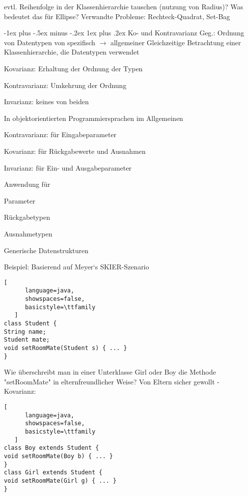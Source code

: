 \documentclass[10pt]{article}
\makeatletter
\renewcommand{\subsubsection}{\@startsection{subsubsection}{3}{0mm}%
                                {-1ex plus -.5ex minus -.2ex}%
                                {1ex plus .2ex}%
                                {\normalfont\small\bfseries}}
\makeatother
\begin{document}
evtl. Reihenfolge in der Klassenhierarchie tauschen (nutzung von Radius)? Was bedeutet das für Ellipse?
Verwandte Probleme: Rechteck-Quadrat, Set-Bag

\subsubsection{Ko- und Kontravarianz}
Geg.: Ordnung von Datentypen von spezifisch $\rightarrow$ allgemeiner
Gleichzeitige Betrachtung einer Klassenhierarchie, die Datentypen verwendet
\begin{itemize*}
  \item Kovarianz: Erhaltung der Ordnung der Typen
  \item Kontravarianz: Umkehrung der Ordnung
  \item Invarianz: keines von beiden
\end{itemize*}
In objektorientierten Programmiersprachen im Allgemeinen
\begin{itemize*}
  \item Kontravarianz: für Eingabeparameter
  \item Kovarianz: für Rückgabewerte und Ausnahmen
  \item Invarianz: für Ein- und Ausgabeparameter
\end{itemize*}
Anwendung für
\begin{itemize*}
  \item Parameter
  \item Rückgabetypen
  \item Ausnahmetypen
  \item Generische Datenstrukturen
\end{itemize*}

Beispiel: Basierend auf Meyer‘s SKIER-Szenario
\begin{lstlisting}[
      language=java,
      showspaces=false,
      basicstyle=\ttfamily
   ]
class Student {
String name;
Student mate;
void setRoomMate(Student s) { ... }
}
\end{lstlisting}

Wie überschreibt man in einer Unterklasse Girl oder Boy die Methode "setRoomMate" in elternfreundlicher Weise? Von Eltern sicher gewollt - Kovarianz:
\begin{lstlisting}[
      language=java,
      showspaces=false,
      basicstyle=\ttfamily
   ]
class Boy extends Student {
void setRoomMate(Boy b) { ... }
}
class Girl extends Student {
void setRoomMate(Girl g) { ... }
}
\end{lstlisting}
\end{document}
